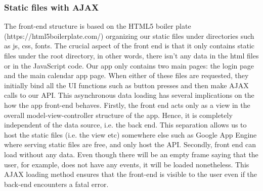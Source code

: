 \documentclass[10pt,a4paper]{article}
\begin{document}
\subsubsection{Static files with AJAX}
The front-end structure is based on the HTML5 boiler plate 
(https://html5boilerplate.com/) organizing our static files under directories 
such as js, css, fonts. The crucial aspect of the front end is that it only 
contains static files under the root directory, in other words, there isn't any 
data in the html files or in the JavaScript code. Our app only contains two main 
pages: the login page and the main calendar app page. When either of these files 
are requested, they initially bind all the UI functions such as button presses 
and then make AJAX calls to our API. This asynchronous data loading has several 
implications on the how the app front-end behaves. Firstly, the front end acts 
only as a view in the overall model-view-controller structure of the app. Hence, 
it is completely independent of the data source, i.e. the back end. This 
separation allows us to host the static files (i.e. the view etc) somewhere else 
such as Google App Engine where serving static files are free, and only host the 
API. Secondly, front end can load without any data. Even though there will be an 
empty frame saying that the user, for example, does not have any events, it will 
be loaded nonetheless. This AJAX loading method ensures that the front-end is 
visible to the user even if the back-end encounters a fatal error.
\end{document}
